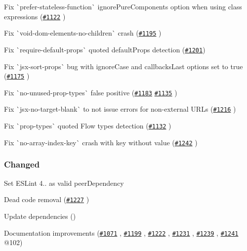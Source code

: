 \begin{DoxyItemize}
\item Fix \`{}prefer-\/stateless-\/function\`{} {\ttfamily ignore\+Pure\+Components} option when using class expressions (\href{https://github.com/yannickcr/eslint-plugin-react/pull/1122}{\tt \#1122} )
\item Fix \`{}void-\/dom-\/elements-\/no-\/children\`{} crash (\href{https://github.com/yannickcr/eslint-plugin-react/pull/1195}{\tt \#1195} )
\item Fix \`{}require-\/default-\/props\`{} quoted {\ttfamily default\+Props} detection (\href{https://github.com/yannickcr/eslint-plugin-react/issues/1201}{\tt \#1201})
\item Fix \`{}jsx-\/sort-\/props\`{} bug with {\ttfamily ignore\+Case} and {\ttfamily callbacks\+Last} options set to {\ttfamily true} (\href{https://github.com/yannickcr/eslint-plugin-react/issues/1175}{\tt \#1175} )
\item Fix \`{}no-\/unused-\/prop-\/types\`{} false positive (\href{https://github.com/yannickcr/eslint-plugin-react/issues/1183}{\tt \#1183} \href{https://github.com/yannickcr/eslint-plugin-react/issues/1135}{\tt \#1135} )
\item Fix \`{}jsx-\/no-\/target-\/blank\`{} to not issue errors for non-\/external U\+R\+Ls (\href{https://github.com/yannickcr/eslint-plugin-react/pull/1216}{\tt \#1216} )
\item Fix \`{}prop-\/types\`{} quoted Flow types detection (\href{https://github.com/yannickcr/eslint-plugin-react/pull/1132}{\tt \#1132} )
\item Fix \`{}no-\/array-\/index-\/key\`{} crash with {\ttfamily key} without value (\href{https://github.com/yannickcr/eslint-plugin-react/issues/1242}{\tt \#1242} )
\end{DoxyItemize}

\subsubsection*{Changed}


\begin{DoxyItemize}
\item Set E\+S\+Lint 4.. as valid peer\+Dependency
\item Dead code removal (\href{https://github.com/yannickcr/eslint-plugin-react/pull/1227}{\tt \#1227} )
\item Update dependencies ()
\item Documentation improvements (\href{https://github.com/yannickcr/eslint-plugin-react/pull/1071}{\tt \#1071} , \href{https://github.com/yannickcr/eslint-plugin-react/pull/1199}{\tt \#1199} , \href{https://github.com/yannickcr/eslint-plugin-react/pull/1222}{\tt \#1222} , \href{https://github.com/yannickcr/eslint-plugin-react/pull/1231}{\tt \#1231} , \href{https://github.com/yannickcr/eslint-plugin-react/pull/1239}{\tt \#1239} , \href{https://github.com/yannickcr/eslint-plugin-react/pull/1241}{\tt \#1241} @102)
\end{DoxyItemize}

